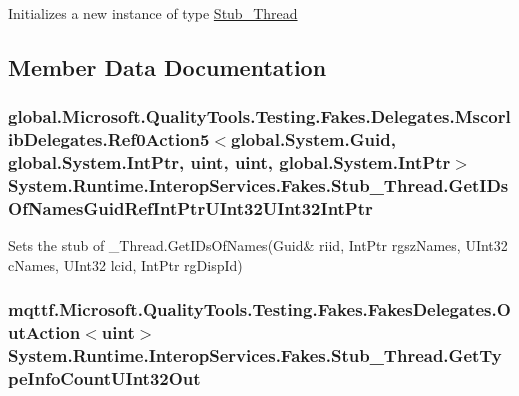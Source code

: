 Initializes a new instance of type \hyperlink{class_system_1_1_runtime_1_1_interop_services_1_1_fakes_1_1_stub___thread}{Stub\-\_\-\-Thread}



\subsection{Member Data Documentation}
\hypertarget{class_system_1_1_runtime_1_1_interop_services_1_1_fakes_1_1_stub___thread_a89a987d79bc76a1004c935029bdaa84c}{
\subsubsection[{Get\-I\-Ds\-Of\-Names\-Guid\-Ref\-Int\-Ptr\-U\-Int32\-U\-Int32\-Int\-Ptr}]{\setlength{\rightskip}{0pt plus 5cm}global.\-Microsoft.\-Quality\-Tools.\-Testing.\-Fakes.\-Delegates.\-Mscorlib\-Delegates.\-Ref0\-Action5$<$global.\-System.\-Guid, global.\-System.\-Int\-Ptr, uint, uint, global.\-System.\-Int\-Ptr$>$ System.\-Runtime.\-Interop\-Services.\-Fakes.\-Stub\-\_\-\-Thread.\-Get\-I\-Ds\-Of\-Names\-Guid\-Ref\-Int\-Ptr\-U\-Int32\-U\-Int32\-Int\-Ptr}}\label{class_system_1_1_runtime_1_1_interop_services_1_1_fakes_1_1_stub___thread_a89a987d79bc76a1004c935029bdaa84c}


Sets the stub of \-\_\-\-Thread.\-Get\-I\-Ds\-Of\-Names(Guid\& riid, Int\-Ptr rgsz\-Names, U\-Int32 c\-Names, U\-Int32 lcid, Int\-Ptr rg\-Disp\-Id)

\hypertarget{class_system_1_1_runtime_1_1_interop_services_1_1_fakes_1_1_stub___thread_a624b209b6951ac3bf073af10e0756cca}{
\subsubsection[{Get\-Type\-Info\-Count\-U\-Int32\-Out}]{\setlength{\rightskip}{0pt plus 5cm}mqttf.\-Microsoft.\-Quality\-Tools.\-Testing.\-Fakes.\-Fakes\-Delegates.\-Out\-Action$<$uint$>$ System.\-Runtime.\-Interop\-Services.\-Fakes.\-Stub\-\_\-\-Thread.\-Get\-Type\-Info\-Count\-U\-Int32\-Out}}\label{class_system_1_1_runtime_1_1_interop_services_1_1_fakes_1_1_stub___thread_a624b209b6951ac3bf073af10e0756cca}


